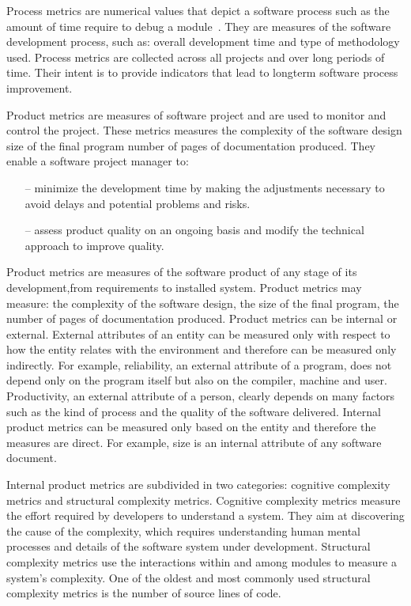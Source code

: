 Process metrics are numerical values that depict a software process such as the amount of time require to debug a module~\cite{metrics2}. They are measures of the software development process, such as: overall development time and type of methodology used. Process metrics are collected across all projects and over long periods of time. Their intent is to provide indicators that lead to longterm software process improvement.

Product metrics are measures of software project and are used to monitor and control the project. These metrics measures the complexity of the software design size of the final program number of pages of documentation produced. They enable a software project manager to:

\begin{itemize}
	\item[--] minimize the development time by making the adjustments necessary to avoid delays
	and potential problems and risks.
	\item[--] assess product quality on an ongoing basis and modify the technical approach to improve
	quality.
\end{itemize}

Product metrics are measures of the software product of any stage of its development,from requirements to installed system. Product metrics may measure: the complexity of the software design, the size of the final program, the number of pages of documentation produced.
Product metrics can be internal or external. External attributes of an entity can be measured only with respect to how the entity relates with the environment and therefore can be measured only indirectly. For example, reliability, an external attribute of a program, does not depend only on the program itself but also on the compiler, machine and user. Productivity, an external attribute of a person, clearly depends on many factors such as the kind of process and the quality of the software delivered. Internal product metrics can be measured only based on the entity and therefore the measures are direct. For example, size is an internal attribute of any software document.

Internal product metrics are subdivided in two categories: cognitive
complexity metrics and structural complexity metrics. Cognitive complexity metrics measure the effort required by developers to understand a system. They aim at discovering the cause of the complexity, which requires understanding human mental processes and details of the software system under development. Structural complexity metrics use the interactions within and among modules to measure a system’s complexity. One of the oldest and most commonly used structural complexity metrics is the number of source lines of code.

